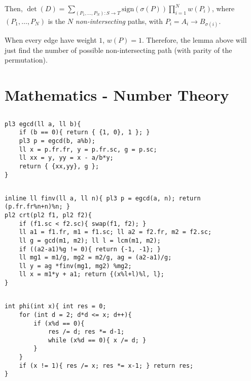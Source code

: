 \documentclass[landscape, 8pt, a4paper, oneside, twocolumn]{extarticle}
\begin{document}
Then, $\det(D) = \sum_{(P_1, \ldots, P_N) \colon S \to T} \mathrm{sign}(\sigma(P)) \prod_{i=1}^{N} w(P_i)$, where $(P_1, \ldots, P_N)$ is the $N$ \textit{non-intersecting} paths, with $P_i = A_i \to B_{\sigma(i)}$.

When every edge have weight $1$, $w(P) = 1$. Therefore, the lemma above will just find the number of possible non-intersecting path (with parity of the permutation).
\section{Mathematics - Number Theory}
\subsection{}
\subsection{}
\begin{verbatim}
pl3 egcd(ll a, ll b){
    if (b == 0){ return { {1, 0}, 1 }; }
    pl3 p = egcd(b, a%b);
    ll x = p.fr.fr, y = p.fr.sc, g = p.sc;
    ll xx = y, yy = x - a/b*y;
    return { {xx,yy}, g };
}
\end{verbatim}
\subsection{}
\begin{verbatim}
inline ll finv(ll a, ll n){ pl3 p = egcd(a, n); return (p.fr.fr%n+n)%n; }
pl2 crt(pl2 f1, pl2 f2){
    if (f1.sc < f2.sc){ swap(f1, f2); }
    ll a1 = f1.fr, m1 = f1.sc; ll a2 = f2.fr, m2 = f2.sc;
    ll g = gcd(m1, m2); ll l = lcm(m1, m2);
    if ((a2-a1)%g != 0){ return {-1, -1}; }
    ll mg1 = m1/g, mg2 = m2/g, ag = (a2-a1)/g;
    ll y = ag *finv(mg1, mg2) %mg2;
    ll x = m1*y + a1; return {(x%l+l)%l, l};
}
\end{verbatim}
\subsection{}
\begin{verbatim}
int phi(int x){ int res = 0;
    for (int d = 2; d*d <= x; d++){
        if (x%d == 0){
            res /= d; res *= d-1;
            while (x%d == 0){ x /= d; }
        }
    }
    if (x != 1){ res /= x; res *= x-1; } return res;
}
\end{verbatim}
\end{document}
